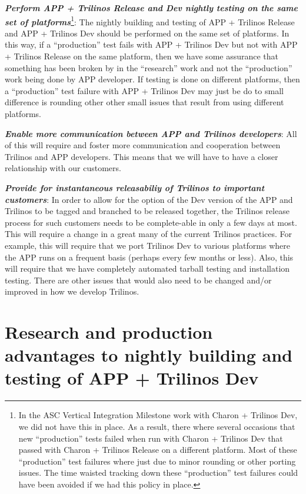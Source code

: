 \documentclass[pdf,ps2pdf,11pt]{SANDreport}
\begin{document}
{}\textit{\textbf{Perform APP + Trilinos Release and Dev nightly testing on
the same set of platforms}}\footnote{In the ASC Vertical Integration Milestone
work with Charon + Trilinos Dev, we did not have this in place.  As a result,
there where several occasions that new ``production'' tests failed when run
with Charon + Trilinos Dev that passed with Charon + Trilinos Release on a
different platform.  Most of these ``production'' test failures where just due
to minor rounding or other porting issues.  The time waisted tracking down
these ``production'' test failures could have been avoided if we had this
policy in place.}: The nightly building and testing of APP + Trilinos Release
and APP + Trilinos Dev should be performed on the same set of platforms.  In
this way, if a ``production'' test fails with APP + Trilinos Dev but not with
APP + Trilinos Release on the same platform, then we have some assurance that
something has been broken by in the ``research'' work and not the
``production'' work being done by APP developer.  If testing is done on
different platforms, then a ``production'' test failure with APP + Trilinos
Dev may just be do to small difference is rounding other other small issues
that result from using different platforms.

{}\textit{\textbf{Enable more communication between APP and Trilinos developers}}:
All of this will require and foster more communication and cooperation between
Trilinos and APP developers.  This means that we will have to have a closer
relationship with our customers.

{}\textit{\textbf{Provide for instantaneous releasabiliy of Trilinos to important
customers}}: In order to allow for the option of the Dev version of the APP and
Trilinos to be tagged and branched to be released together, the Trilinos
release process for such customers needs to be complete-able in only a few days
at most.  This will require a change in a great many of the current Trilinos
practices.  For example, this will require that we port Trilinos Dev to
various platforms where the APP runs on a frequent basis (perhaps every few
months or less).  Also, this will require that we have completely automated
tarball testing and installation testing.  There are other issues that would
also need to be changed and/or improved in how we develop Trilinos.


%
{}\section{Research and production advantages to nightly building and testing
of APP + Trilinos Dev}
%
\end{document}
